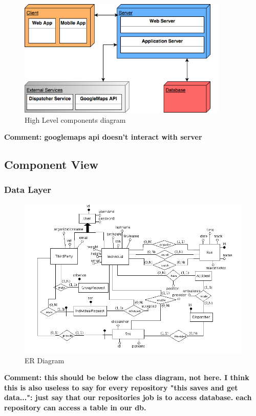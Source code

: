 \documentclass[a4paper]{article}
\newcommand{\comment}[1]{\textbf{Comment: #1}}
\begin{document}
\hfill
\begin{figure}[!htpb]
    	\centering
    	\includegraphics[width=100mm,keepaspectratio]{images/highlevel2.png}
    	\caption{High Level components diagram}
\end{figure}
\hfill
\comment{googlemaps api doesn't interact with server}
\newpage
\subsection{Component View}
    
    \subsubsection{Data Layer}
    \begin{figure}[!htpb]
        \centering
        \includegraphics[width=\textwidth,keepaspectratio]{DD/images/er_diagram.png}
        \caption{ER Diagram}
        \label{fig:ER_trackme}
    \end{figure}
    
    \comment{this should be below the class diagram, not here. I think this is also useless to say for every repository "this saves and get data...": just say that our repositories job is to access database. each repository can access a table in our db.}
\end{document}
